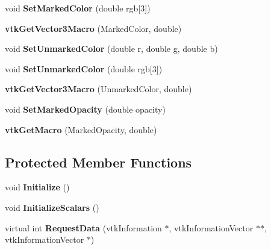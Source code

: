 \begin{DoxyCompactItemize}
\item 
\hypertarget{classvtkCellsFilter_aa0fb9773cebc32fa7ae86e997bed4966}{
void {\bfseries SetMarkedColor} (double rgb\mbox{[}3\mbox{]})}
\label{classvtkCellsFilter_aa0fb9773cebc32fa7ae86e997bed4966}

\item 
\hypertarget{classvtkCellsFilter_ae990e967c5097f32c8efb3801b334c54}{
{\bfseries vtkGetVector3Macro} (MarkedColor, double)}
\label{classvtkCellsFilter_ae990e967c5097f32c8efb3801b334c54}

\item 
\hypertarget{classvtkCellsFilter_a86d9c6bff9700f59eb294c0ebd21695e}{
void {\bfseries SetUnmarkedColor} (double r, double g, double b)}
\label{classvtkCellsFilter_a86d9c6bff9700f59eb294c0ebd21695e}

\item 
\hypertarget{classvtkCellsFilter_a2690f015ae1ef26998849926b538acf0}{
void {\bfseries SetUnmarkedColor} (double rgb\mbox{[}3\mbox{]})}
\label{classvtkCellsFilter_a2690f015ae1ef26998849926b538acf0}

\item 
\hypertarget{classvtkCellsFilter_a8b0bce949cc99c3c4463ceb59d23afc6}{
{\bfseries vtkGetVector3Macro} (UnmarkedColor, double)}
\label{classvtkCellsFilter_a8b0bce949cc99c3c4463ceb59d23afc6}

\item 
\hypertarget{classvtkCellsFilter_a1c16291e3ae310b8eae8d0a6b5194cf2}{
void {\bfseries SetMarkedOpacity} (double opacity)}
\label{classvtkCellsFilter_a1c16291e3ae310b8eae8d0a6b5194cf2}

\item 
\hypertarget{classvtkCellsFilter_af60eff0fa212134fe663bfc6f45c9ce3}{
{\bfseries vtkGetMacro} (MarkedOpacity, double)}
\label{classvtkCellsFilter_af60eff0fa212134fe663bfc6f45c9ce3}

\end{DoxyCompactItemize}
\subsection*{Protected Member Functions}
\begin{DoxyCompactItemize}
\item 
\hypertarget{classvtkCellsFilter_a5dd374d00109c7f750288fb186be0f30}{
void {\bfseries Initialize} ()}
\label{classvtkCellsFilter_a5dd374d00109c7f750288fb186be0f30}

\item 
\hypertarget{classvtkCellsFilter_adf17151e234e13a2040268529a320dfb}{
void {\bfseries InitializeScalars} ()}
\label{classvtkCellsFilter_adf17151e234e13a2040268529a320dfb}

\item 
\hypertarget{classvtkCellsFilter_aa7029a2eb18e53ff1c81461880796d30}{
virtual int {\bfseries RequestData} (vtkInformation $\ast$, vtkInformationVector $\ast$$\ast$, vtkInformationVector $\ast$)}
\label{classvtkCellsFilter_aa7029a2eb18e53ff1c81461880796d30}

\end{DoxyCompactItemize}
